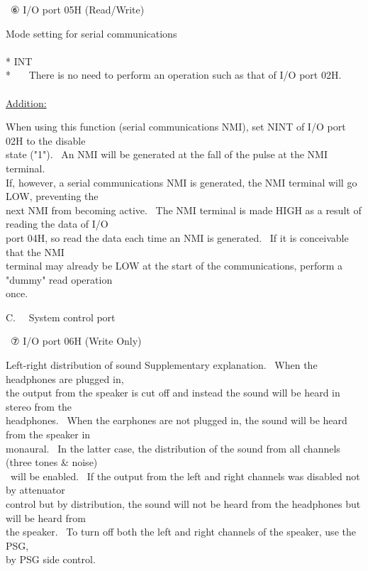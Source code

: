 \documentclass[a4paper,10pt]{article}
\begin{document}
\noindent \ ⑥ I/O port 05H (Read/Write)\par
Mode setting for serial communications\\
\\
{*} INT\\
{*} \ \ \ There is no need to perform an operation such as that of I/O port 02H.\\
\\
\uline{Addition:}\par
When using this function (serial communications NMI), set NINT of I/O port 02H to the disable\\
state ("1"). \ An NMI will be generated at the fall of the pulse at the NMI terminal.\\
If, however, a serial communications NMI is generated, the NMI terminal will go LOW, preventing the\\
next NMI from becoming active. \ The NMI terminal is made HIGH as a result of reading the data of I/O\\
port 04H, so read the data each time an NMI is generated. \ If it is conceivable that the NMI\\
terminal may already be LOW at the start of the communications, perform a "dummy" read operation\\
once.\\

{}

\noindent C. \ \ System control port\\

{}

\noindent \ ⑦ I/O port 06H (Write Only)\par
Left-right distribution of sound Supplementary explanation. \ When the headphones are plugged in,\\
the output from the speaker is cut off and instead the sound will be heard in stereo from the\\
headphones. \ When the earphones are not plugged in, the sound will be heard from the speaker in\\
monaural. \ In the latter case, the distribution of the sound from all channels (three tones \& noise)\\
\phantom \ will be enabled. \ If the output from the left and right channels was disabled not by attenuator\\
control but by distribution, the sound will not be heard from the headphones but will be heard from\\
the speaker. \ To turn off both the left and right channels of the speaker, use the PSG,\\
by PSG side control.
\end{document}
